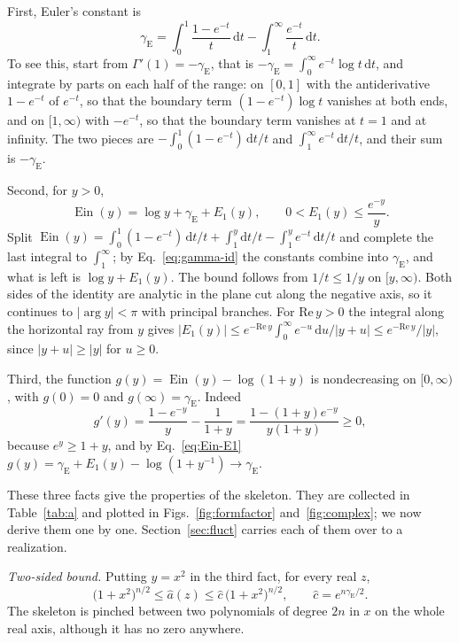 \documentclass[aps,prd,10pt,twocolumn,superscriptaddress,nofootinbib,floatfix,longbibliography]{revtex4-2}
\newcommand{\dd}{\mathrm{d}}
\newcommand{\Ein}{\operatorname{Ein}}
\newcommand{\gE}{\gamma_{\mathrm E}}
\begin{document}
First, Euler's constant is
\begin{equation}
\label{eq:gamma-id}
\gE=\int_0^1\frac{1-e^{-t}}{t}\,\dd t-\int_1^\infty\frac{e^{-t}}{t}\,\dd t .
\end{equation}
To see this, start from $\Gamma'(1)=-\gE$, that is $-\gE=\int_0^\infty e^{-t}\log t\,\dd t$, and integrate by parts on each half of the range: on $[0,1]$ with the antiderivative $1-e^{-t}$ of $e^{-t}$, so that the boundary term $(1-e^{-t})\log t$ vanishes at both ends, and on $[1,\infty)$ with $-e^{-t}$, so that the boundary term vanishes at $t=1$ and at infinity. The two pieces are $-\int_0^1(1-e^{-t})\,\dd t/t$ and $\int_1^\infty e^{-t}\,\dd t/t$, and their sum is $-\gE$.

Second, for $y>0$,
\begin{equation}
\label{eq:Ein-E1}
\Ein(y)=\log y+\gE+E_1(y),\qquad 0<E_1(y)\le\frac{e^{-y}}{y}.
\end{equation}
Split $\Ein(y)=\int_0^1(1-e^{-t})\,\dd t/t+\int_1^y\dd t/t-\int_1^ye^{-t}\,\dd t/t$ and complete the last integral to $\int_1^\infty$; by Eq.~\eqref{eq:gamma-id} the constants combine into $\gE$, and what is left is $\log y+E_1(y)$. The bound follows from $1/t\le1/y$ on $[y,\infty)$. Both sides of the identity are analytic in the plane cut along the negative axis, so it continues to $|\arg y|<\pi$ with principal branches. For $\mathrm{Re}\,y>0$ the integral along the horizontal ray from $y$ gives $|E_1(y)|\le e^{-\mathrm{Re}\,y}\int_0^\infty e^{-u}\,\dd u/|y+u|\le e^{-\mathrm{Re}\,y}/|y|$, since $|y+u|\ge|y|$ for $u\ge0$.

Third, the function $g(y)=\Ein(y)-\log(1+y)$ is nondecreasing on $[0,\infty)$, with $g(0)=0$ and $g(\infty)=\gE$. Indeed
\[
g'(y)=\frac{1-e^{-y}}{y}-\frac1{1+y}=\frac{1-(1+y)e^{-y}}{y(1+y)}\ge0,
\]
because $e^{y}\ge1+y$, and by Eq.~\eqref{eq:Ein-E1} $g(y)=\gE+E_1(y)-\log(1+y^{-1})\to\gE$.

These three facts give the properties of the skeleton. They are collected in Table~\ref{tab:a} and plotted in Figs.~\ref{fig:formfactor} and~\ref{fig:complex}; we now derive them one by one. Section~\ref{sec:fluct} carries each of them over to a realization.

\textit{Two-sided bound.} Putting $y=x^2$ in the third fact, for every real $z$,
\begin{equation}
\label{eq:twosided}
\bigl(1+x^2\bigr)^{n/2}\le\hat a(z)\le\hat c\,\bigl(1+x^2\bigr)^{n/2},\qquad\hat c=e^{n\gE/2}.
\end{equation}
The skeleton is pinched between two polynomials of degree $2n$ in $x$ on the whole real axis, although it has no zero anywhere.
\end{document}
